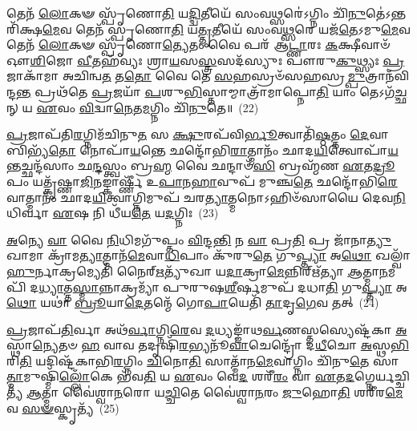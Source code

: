 𑌤𑍇𑌨᳴ \ul{𑌲𑍋}\-𑌕𑍟 𑌸𑍍𑌪𑍃᳴𑌣𑍋\-\ul{𑌤𑌿} 𑌯\-\ul{𑌦𑍍𑌦𑍍𑌵𑌿}\-𑌤𑍀𑌯𑍇᳴ 𑌸𑌂𑌵\-\ul{𑌥𑍍𑌸}\-𑌰𑍇॑\-𑌽𑌗𑍍𑌨𑌿𑌂 𑌚𑌿᳴\-\ul{𑌨𑍁}\-𑌤𑍇॑\-𑌽𑌨𑍍𑌤𑌰𑌿᳴𑌕𑍍𑌷\-\ul{𑌮𑍇}\-𑌵 𑌤𑍇𑌨᳴ 𑌸𑍍𑌪𑍃𑌣𑍋\-\ul{𑌤𑌿} 𑌯\-\ul{𑌤𑍍𑌤𑍃}\-𑌤𑍀𑌯𑍇᳴ 𑌸𑌂𑌵\-\ul{𑌥𑍍𑌸}\-𑌰𑍇 𑌯𑌜᳴\-\ul{𑌤𑍇}\-\-𑌽𑌮𑍁\-\ul{𑌮𑍇}\-𑌵 𑌤𑍇𑌨᳴ \ul{𑌲𑍋}\-𑌕𑍟 𑌸𑍍𑌪𑍃᳴𑌣𑍋\-\ul{𑌤𑍍𑌯𑍇}\-𑌤𑌂 𑌵𑍈 𑌪𑌰᳴ 𑌆\-\ul{𑌟𑍍𑌣𑌾}\-𑌰𑌃 \ul{𑌕}\-𑌕𑍍𑌷𑍀𑌵𑌾𑍞᳴ 𑌔\-\ul{𑌶𑌿}\-𑌜𑍋 \ul{𑌵𑍀}\-𑌤𑌹᳴𑌵𑍍𑌯𑌃 𑌶𑍍𑌰𑌾\-\ul{𑌯}\-𑌸\-\ul{𑌸𑍍𑌤𑍍𑌰}\-𑌸𑌦᳴𑌸𑍍𑌯𑍁𑌃 𑌪𑍗𑌰𑍁\-\ul{𑌕𑍁}\-𑌥𑍍𑌸𑍍𑌯𑌃 \ul{𑌪𑍍𑌰}\-𑌜𑌾𑌕𑌾᳴𑌮𑌾 𑌅𑌚𑌿𑌨𑍍𑌵\-\ul{𑌤} 𑌤\-\ul{𑌤𑍋} 𑌵𑍈 𑌤𑍇 \ul{𑌸}\-𑌹𑌸𑍍𑌰𑍞᳴𑌸𑌹𑌸𑍍𑌰\-\ul{𑌮𑍍𑌪𑍁}\-𑌤𑍍𑌰𑌾𑌨᳴𑌵𑌿𑌨𑍍𑌦\-\ul{𑌨𑍍𑌤} 𑌪𑍍𑌰𑌥᳴𑌤𑍇 \ul{𑌪𑍍𑌰}\-𑌜𑌯𑌾᳴ \ul{𑌪}\-𑌶𑍁\-\ul{𑌭𑌿}\-𑌸𑍍𑌤𑌾𑌮𑍍𑌮𑌾𑌤𑍍𑌰𑌾᳴𑌮𑌾𑌪𑍍𑌨𑍋\-\ul{𑌤𑌿} 𑌯𑌾𑌂 𑌤𑍇\-𑌽𑌗᳴\-\ul{𑌚𑍍𑌛}\-𑌨𑍍 𑌯 \ul{𑌏}\-𑌵𑌂 \ul{𑌵𑌿}\-𑌦𑍍𑌵𑌾\-\ul{𑌨𑍇}\-𑌤\-\ul{𑌮}\-𑌗𑍍𑌨𑌿𑌂 𑌚𑌿᳴\-\ul{𑌨𑍁}\-𑌤𑍇॥~(22)

{\anuvakamend[{\-\ul{𑌦𑌾}\-\-\ul{𑌧𑌾}\-\-\ul{𑌰} \ul{𑌤𑍍𑌰𑌿}\-𑌷𑍍𑌟𑍁𑌭᳴\-\ul{𑌮𑌿}\-𑌮\-\ul{𑌮𑍇}\-𑌵𑍈𑌵𑌂 \ul{𑌚}\-𑌤𑍍𑌵𑌾𑌰𑌿᳴ 𑌚}]}%

\-\ul{𑌪𑍍𑌰}\-𑌜𑌾𑌪᳴𑌤𑌿\-\ul{𑌰}\-𑌗𑍍𑌨𑌿𑌮᳴𑌚𑌿𑌨𑍁\-\ul{𑌤} 𑌸 \ul{𑌕𑍍𑌷𑍁}\-𑌰𑌪᳴𑌵𑌿\-\ul{𑌰𑍍𑌭𑍂}\-𑌤𑍍𑌵𑌾𑌤𑌿᳴\-\ul{𑌷𑍍𑌠}\-𑌤𑍍𑌤𑌂 \ul{𑌦𑍇}\-𑌵𑌾 𑌬𑌿𑌭𑍍𑌯᳴\-\ul{𑌤𑍋} 𑌨𑍋𑌪𑌾᳴\-\ul{𑌯}\-𑌨𑍍𑌤𑍇 𑌛𑌨𑍍𑌦𑍋᳴𑌭𑌿\-\ul{𑌰𑌾}\-𑌤𑍍𑌮𑌾𑌨𑌂᳴ 𑌛𑌾𑌦\-\ul{𑌯𑌿}\-𑌤𑍍𑌵𑍋𑌪𑌾᳴\-\ul{𑌯}\-𑌨𑍍𑌤𑌚𑍍𑌛𑌨𑍍𑌦᳴𑌸𑌾𑌂 𑌛\-\ul{𑌨𑍍𑌦}\-𑌸𑍍𑌤𑍍𑌵𑌂 𑌬𑍍𑌰\-\ul{𑌹𑍍𑌮} 𑌵𑍈 𑌛𑌨𑍍𑌦𑌾𑍞᳴\-\ul{𑌸𑌿} 𑌬𑍍𑌰𑌹𑍍𑌮᳴𑌣 \ul{𑌏}\-𑌤\-\ul{𑌦𑍍𑌰𑍂}\-𑌪𑌂 𑌯𑌤𑍍𑌕𑍃᳴𑌷𑍍𑌣𑌾\-\ul{𑌜𑌿}\-𑌨𑌙𑍍𑌕𑌾𑌰𑍍𑌷𑍍𑌣𑍀᳴ 𑌉\-\ul{𑌪𑌾}\-𑌨\-\ul{𑌹𑌾}\-𑌵𑍁𑌪᳴ 𑌮𑍁𑌞𑍍𑌚\-\ul{𑌤𑍇} 𑌛𑌨𑍍𑌦𑍋᳴𑌭𑌿\-\ul{𑌰𑍇}\-𑌵𑌾𑌤𑍍𑌮𑌾𑌨𑌂᳴ 𑌛𑌾𑌦\-\ul{𑌯𑌿}\-𑌤𑍍𑌵𑌾𑌗𑍍𑌨𑌿𑌮𑍁𑌪᳴ 𑌚𑌰\-\ul{𑌤𑍍𑌯𑌾}\-𑌤𑍍𑌮𑌨𑍋\-𑌽𑌹𑌿𑍞᳴𑌸𑌾𑌯𑍈 𑌦𑍇𑌵\-\ul{𑌨𑌿}\-𑌧𑌿𑌰𑍍𑌵𑌾 \ul{𑌏}\-𑌷 𑌨𑌿 𑌧𑍀᳴𑌯\-\ul{𑌤𑍇} 𑌯\-\ul{𑌦}\-𑌗𑍍𑌨𑌿𑌃~(23)

\-\ul{𑌅}\-𑌨𑍍𑌯𑍇 \ul{𑌵𑌾} 𑌵𑍈 \ul{𑌨𑌿}\-𑌧𑌿𑌮𑌗𑍁᳴𑌪𑍍𑌤𑌂 \ul{𑌵𑌿}\-𑌨𑍍𑌦\-\ul{𑌨𑍍𑌤𑌿} 𑌨 \ul{𑌵𑌾} 𑌪𑍍𑌰\-\ul{𑌤𑌿} 𑌪𑍍𑌰 𑌜𑌾᳴𑌨𑌾\-\ul{𑌤𑍍𑌯𑍁}\-𑌖𑌾𑌮𑌾 𑌕𑍍𑌰𑌾᳴𑌮\-\ul{𑌤𑍍𑌯𑌾}\-𑌤𑍍𑌮𑌾𑌨᳴\-\ul{𑌮𑍇}\-𑌵𑌾\-\ul{𑌧𑌿}\-𑌪𑌾𑌂 𑌕𑍁᳴𑌰𑍁\-\ul{𑌤𑍇} 𑌗𑍁\-\ul{𑌪𑍍𑌤𑍍𑌯𑌾} 𑌅\-\ul{𑌥𑍋} 𑌖𑌲𑍍𑌵𑌾᳴\-\ul{𑌹𑍁}\-𑌰𑍍𑌨𑌾𑌕𑍍𑌰𑌮𑍍𑌯𑍇𑌤𑌿᳴ 𑌨𑍈𑌰𑍍\mbox{}\-\ul{𑌋}\-𑌤𑍍𑌯𑍁᳴𑌖𑌾 𑌯\-\ul{𑌦𑌾}\-𑌕𑍍𑌰𑌾\-\ul{𑌮𑍇}\-𑌨𑍍𑌨𑌿𑌰𑍍\mbox{}𑌋᳴𑌤𑍍𑌯𑌾 \ul{𑌆}\-𑌤𑍍𑌮𑌾\-\ul{𑌨}\-𑌮𑌪𑌿᳴ 𑌦\-\ul{𑌧𑍍𑌯𑌾}\-𑌤𑍍𑌤\-\ul{𑌸𑍍𑌮𑌾}\-𑌨𑍍𑌨𑌾𑌕𑍍𑌰𑌮𑍍𑌯𑌾᳴ 𑌪𑍁𑌰𑍁𑌷\-\ul{𑌶𑍀}\-𑌰𑍍\mbox{}𑌷𑌮𑍁𑌪᳴ 𑌦𑌧𑌾\-\ul{𑌤𑌿} 𑌗𑍁\-\ul{𑌪𑍍𑌤𑍍𑌯𑌾} 𑌅\-\ul{𑌥𑍋} 𑌯𑌥𑌾॑ \ul{𑌬𑍍𑌰𑍂}\-𑌯𑌾\-\ul{𑌦𑍇}\-𑌤𑌨𑍍𑌮𑍇᳴ 𑌗𑍋\-\ul{𑌪𑌾}\-𑌯𑍇𑌤𑌿᳴ \ul{𑌤𑌾}\-𑌦𑍃\-\ul{𑌗𑍇}\-𑌵 𑌤𑌤𑍍~(24)

\-\ul{𑌪𑍍𑌰}\-𑌜𑌾𑌪᳴\-\ul{𑌤𑌿}\-𑌰𑍍𑌵𑌾 𑌅𑌥᳴\-\ul{𑌰𑍍𑌵𑌾}\-𑌗𑍍𑌨𑌿\-\ul{𑌰𑍇}\-𑌵 \ul{𑌦}\-𑌧𑍍𑌯𑌙𑍍𑌙𑌾᳴𑌥\-\ul{𑌰𑍍𑌵}\-𑌣𑌸𑍍𑌤𑌸𑍍𑌯𑍇𑌷𑍍𑌟᳴𑌕𑌾 \ul{𑌅}\-𑌸𑍍𑌥𑌾\-\ul{𑌨𑍍𑌯𑍇}\-𑌤𑍞 \ul{𑌹} 𑌵𑌾𑌵 𑌤𑌦𑍃𑌷𑌿᳴\-\ul{𑌰}\-𑌭𑍍𑌯𑌨𑍂᳴\-\ul{𑌵𑌾}\-𑌚𑍇𑌨𑍍𑌦𑍍𑌰𑍋᳴ 𑌦\-\ul{𑌧𑍀}\-𑌚𑍋 \ul{𑌅}\-𑌸𑍍𑌥\-\ul{𑌭𑌿}\-𑌰𑌿\-\ul{𑌤𑌿} 𑌯𑌦𑌿𑌷𑍍𑌟᳴𑌕𑌾𑌭𑌿\-\ul{𑌰}\-𑌗𑍍𑌨𑌿𑌂 \ul{𑌚𑌿}\-𑌨𑍋\-\ul{𑌤𑌿} 𑌸𑌾𑌤𑍍𑌮𑌾᳴𑌨\-\ul{𑌮𑍇}\-𑌵𑌾𑌗𑍍𑌨𑌿𑌂 𑌚𑌿᳴𑌨𑍁\-\ul{𑌤𑍇} 𑌸𑌾\-\ul{𑌤𑍍𑌮𑌾}\-𑌮𑍁𑌷𑍍𑌮𑌿᳴\-\ul{𑌲𑍍𑌲𑍋𑌁}\-𑌕𑍇 𑌭᳴𑌵\-\ul{𑌤𑌿} 𑌯 \ul{𑌏}\-𑌵𑌂 𑌵𑍇\-\ul{𑌦} 𑌶𑌰𑍀᳴\-\ul{𑌰𑌂} 𑌵𑌾 \ul{𑌏}\-𑌤\-\ul{𑌦}\-𑌗𑍍𑌨𑍇𑌰𑍍𑌯𑌚𑍍𑌚𑌿𑌤𑍍𑌯᳴ \ul{𑌆}\-𑌤𑍍𑌮𑌾 𑌵𑍈॑𑌶𑍍𑌵𑌾\-\ul{𑌨}\-𑌰𑍋 𑌯\-\ul{𑌚𑍍𑌚𑌿}\-𑌤𑍇 𑌵𑍈॑𑌶𑍍𑌵𑌾\-\ul{𑌨}\-𑌰𑌂 \ul{𑌜𑍁}\-𑌹𑍋\-\ul{𑌤𑌿} 𑌶𑌰𑍀᳴𑌰\-\ul{𑌮𑍇}\-𑌵 \ul{𑌸}\-\-\ul{𑍟}\-𑌸𑍍𑌕𑍃𑌤𑍍𑌯᳴~(25)

